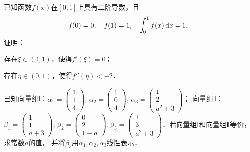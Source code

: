 \documentclass[plain,noanswer,medmath]{../../template/jnuexam}
\begin{document}
\begin{problem}[points=11]
已知函数$f(x)$在$[0,1]$上具有二阶导数，且
$$f(0) = 0,\quad f(1) = 1,\quad \int_0^1 f(x)\mathop{}\!\mathrm{d} x = 1.$$
证明：
\begin{enumerate*}
\item 存在$\xi \in(0,1)$，使得$f'(\xi) = 0$；
\item 存在$\eta \in(0,1)$，使得$f''(\eta) < - 2$．
\end{enumerate*}
\end{problem}


\begin{problem}[points=11]
已知向量组Ⅰ：$\alpha_1 = \begin{pmatrix}
  1 \\
  1 \\
  4
\end{pmatrix}$, $\alpha_2 = \begin{pmatrix}
  1 \\
  0 \\
  4
\end{pmatrix}$, $\alpha_3 = \begin{pmatrix}
  1 \\
  2 \\
  a^2 + 3
\end{pmatrix}$；
向量组Ⅱ：$\beta_1 = \begin{pmatrix}
  1 \\
  1 \\
  a + 3
\end{pmatrix}$, $\beta_2 = \begin{pmatrix}
  0 \\
  2 \\
  1 - a
\end{pmatrix}$, $\beta_3 = \begin{pmatrix}
  1 \\
  3 \\
  a^2 + 3
\end{pmatrix}$．若向量组Ⅰ和向量组Ⅱ等价，求常数$a$的值，
并将$\beta_3$用$\alpha_1,\alpha_2,\alpha_3$线性表示．
\end{problem}


\end{document}
